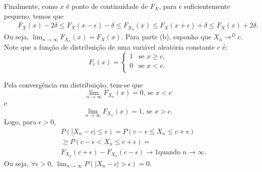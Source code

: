 \begin{frame}
\begin{block}{}
Finalmente, como $x$ é ponto de continuidade de $F_X$, para
$\epsilon$ suficientemente pequeno, temos que
\begin{eqnarray}
& & F_X(x)-2\delta\leq F_X(x-\epsilon)-\delta \leq F_{X_n}(x)\leq F_X(x+\epsilon)+\delta \leq F_X(x)+2\delta.
\nonumber\end{eqnarray}
%
%
%
Ou seja, $\lim_{n\rightarrow\infty}F_{X_n}(x)=F_X(x)$.
%
Para parte (b), suponha que $X_n\rightarrow^D c$. Note que a função
de distribuição de uma variável aleatória constante $c$ é:
%
\[
F_c(x)= \left\{
\begin{array}{ll}
1 & \mbox{se $x\geq c$,} \\
0 & \mbox{se $x<c$.} \\
\end{array}
\right.
\]

%
%
%
Pela convergência em distribuição, tem-se que
$$\lim_{n\rightarrow\infty} F_{X_n}(x)=0\mbox{, se }x<c$$ e
$$\lim_{n\rightarrow\infty} F_{X_n}(x)=1\mbox{, se }x>c.$$ Logo, para
$\epsilon>0$,
%
\begin{eqnarray}
& & P(|X_n-c|\leq \epsilon)=P(c-\epsilon\leq X_n\leq c+\epsilon)\nonumber\\
& & \geq
P(c-\epsilon< X_n\leq c+\epsilon)=
\nonumber\\
& & F_{X_n}(c+\epsilon)-F_{X_n}(c-\epsilon)\rightarrow 1\mbox{
quando }n\rightarrow\infty. \nonumber
\end{eqnarray}
%
%
%
Ou seja, $\forall\epsilon>0$,
$\lim_{n\rightarrow\infty}P(|X_n-c|>\epsilon)=0$. 
\end{block}
\end{frame}
